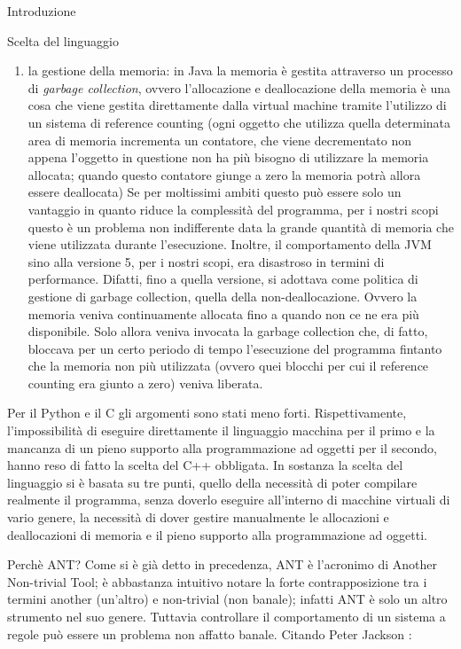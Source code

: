 \begin{chapter}{Introduzione}
\begin{section}{Scelta del linguaggio}
\begin{enumerate}
	\item la gestione della memoria: in Java la memoria \`e gestita attraverso un
	      processo di \textit{garbage collection}, ovvero l'allocazione e deallocazione
				della memoria \`e una cosa che viene gestita direttamente dalla virtual
				machine tramite l'utilizzo di un sistema di reference counting (ogni oggetto
				che utilizza quella determinata area di memoria incrementa un contatore, che
				viene decrementato non appena l'oggetto in questione non ha pi\`u bisogno di
				utilizzare la memoria allocata; quando questo contatore giunge a zero la
				memoria potr\`a allora essere deallocata) Se per moltissimi ambiti questo
				pu\`o essere solo un vantaggio in quanto riduce la complessit\`a del programma,
				per i nostri scopi questo \`e un problema non indifferente data la grande
				quantit\`a di memoria che viene utilizzata durante l'esecuzione. Inoltre, il
				comportamento della JVM sino alla versione 5, per i nostri scopi, era disastroso
				in termini di performance. Difatti, fino a quella versione, si adottava come
				politica di gestione di garbage collection, quella della non-deallocazione.
				Ovvero la memoria veniva continuamente allocata fino a quando non ce ne era pi\`u
				disponibile. Solo allora veniva invocata la garbage collection che, di fatto,
				bloccava per un certo periodo di tempo l'esecuzione del programma fintanto
				che la memoria non pi\`u utilizzata (ovvero quei blocchi per cui il reference
				counting era giunto a zero) veniva liberata.
\end{enumerate}

Per il Python e il C gli argomenti sono stati meno forti. Rispettivamente, l'impossibilit\`a
di eseguire direttamente il linguaggio macchina per il primo e la mancanza di un pieno
supporto alla programmazione ad oggetti per il secondo, hanno reso di fatto la scelta
del C++ obbligata. In sostanza la scelta del linguaggio si \`e basata su tre punti,
quello della necessit\`a di poter compilare realmente il programma, senza doverlo eseguire
all'interno di macchine virtuali di vario genere, la necessit\`a di dover gestire
manualmente le allocazioni e deallocazioni di memoria e il pieno supporto alla programmazione
ad oggetti.

\end{section}

\begin{section}{Perch\`e ANT?}
Come si \`e gi\`a detto in precedenza, ANT \`e l'acronimo di Another Non-trivial Tool;
\`e abbastanza intuitivo notare la forte contrapposizione tra i termini another (un'altro)
e non-trivial (non banale); infatti ANT \`e solo un altro strumento nel suo genere.
Tuttavia controllare il comportamento di un sistema a regole pu\`o essere un problema non
affatto banale. Citando Peter Jackson \cite{Jackson99}:\\


\end{section}
\end{chapter}
